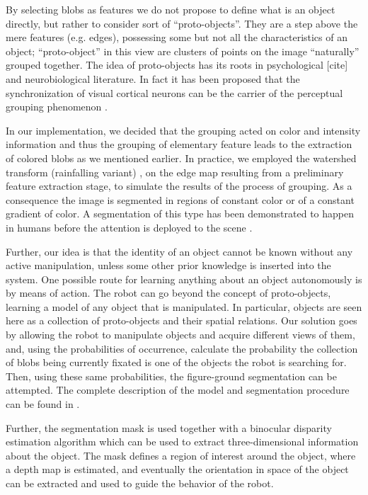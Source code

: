 By selecting blobs as features we do not propose to define what is an object directly, but rather to consider sort of ``proto-objects''. They are a step above the mere features (e.g. edges), possessing some but not all the characteristics of an object; ``proto-object'' in this view are clusters of points on the image ``naturally'' grouped together. The idea of proto-objects has its roots in psychological [cite] and neurobiological literature. In fact it has been proposed that the synchronization of visual cortical neurons can be the carrier of the perceptual grouping phenomenon \cite{eckhorn88coherent,gray89oscillatory}.

In our implementation, we decided that the grouping acted on color and intensity information and thus the grouping of elementary feature leads to the extraction of colored blobs as we mentioned earlier. In practice, we employed the watershed transform (rainfalling variant) \cite{smet00rainfalling}, on the edge map resulting from a preliminary feature extraction stage, to simulate the results of the process of grouping. As a consequence the image is segmented in regions of constant color or of a constant gradient of color. A segmentation of this type has been demonstrated to happen in humans before the attention is deployed to the scene \cite{driver00segmentation}.

Further, our idea is that the identity of an object cannot be known without any active manipulation, unless some other prior knowledge is inserted into the system. One possible route for learning anything about an object autonomously is by means of action. The robot can go beyond the concept of proto-objects, learning a model of any object that is manipulated. In particular, objects are seen here as a collection of proto-objects and their spatial relations. Our solution goes by allowing the robot to manipulate objects and acquire different views of them, and, using the probabilities of occurrence, calculate the probability the collection of blobs being currently fixated is one of the objects the robot is searching for. Then, using these same probabilities, the figure-ground segmentation can be attempted. The complete description of the model and segmentation procedure can be found in \cite{orabona05object}.

Further, the segmentation mask is used together with a binocular disparity estimation algorithm which can be used to extract three-dimensional information about the object. The mask defines a region of interest around the object, where a depth map is estimated, and eventually the orientation in space of the object can be extracted and used to guide the behavior of the robot.

